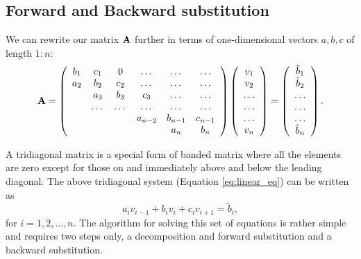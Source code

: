 \documentclass[11pt,a4wide]{article}
\begin{document}
\subsection{Forward and Backward substitution}
We can rewrite our matrix ${\bf A}$ further in terms of one-dimensional vectors $a,b,c$  of length $1:n$:
\begin{equation}
    {\bf A} = \left(\begin{array}{cccccc}
                           b_1& c_1 & 0 &\dots   & \dots &\dots \\
                           a_2 & b_2 & c_2 &\dots &\dots &\dots \\
                           & a_3 & b_3 & c_3 & \dots & \dots \\
                           & \dots   & \dots &\dots   &\dots & \dots \\
                           &   &  &a_{n-2}  &b_{n-1}& c_{n-1} \\
                           &    &  &   &a_n & b_n \\
                      \end{array} \right)\left(\begin{array}{c}
                           v_1\\
                           v_2\\
                           \dots \\
                          \dots  \\
                          \dots \\
                           v_n\\
                      \end{array} \right)
  =\left(\begin{array}{c}
                           \tilde{b}_1\\
                           \tilde{b}_2\\
                           \dots \\
                           \dots \\
                          \dots \\
                           \tilde{b}_n\\
                      \end{array} \right).
\end{equation}

A tridiagonal matrix is a special form of banded matrix where all the elements are zero except for those on and immediately above and below the leading diagonal. The above tridiagonal system (Equation \ref{eq:linear_eq}) can be written as
\begin{equation}
  a_iv_{i-1}+b_iv_i+c_iv_{i+1} = \tilde{b}_i,
\end{equation}
for $i=1,2,\dots,n$. 
The algorithm for solving this set of equations is rather simple and requires two steps only, a decomposition and forward substitution and a backward substitution. 
\end{document}

